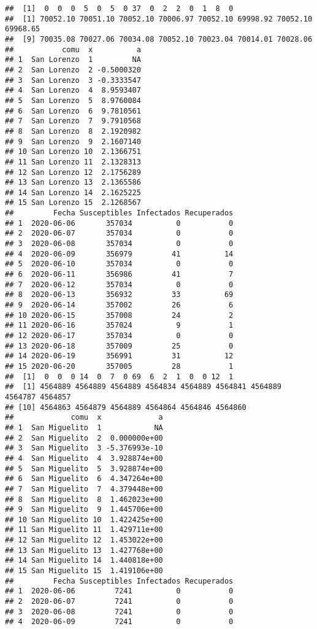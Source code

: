 \documentclass[
]{article}
\begin{document}
\begin{verbatim}
##  [1]  0  0  0  5  0  5  0 37  0  2  2  0  1  8  0
##  [1] 70052.10 70051.10 70052.10 70006.97 70052.10 69998.92 70052.10 69968.65
##  [9] 70035.08 70027.06 70034.08 70052.10 70023.04 70014.01 70028.06
##           comu  x          a
## 1  San Lorenzo  1         NA
## 2  San Lorenzo  2 -0.5000320
## 3  San Lorenzo  3 -0.3333547
## 4  San Lorenzo  4  8.9593407
## 5  San Lorenzo  5  8.9760084
## 6  San Lorenzo  6  9.7810561
## 7  San Lorenzo  7  9.7910568
## 8  San Lorenzo  8  2.1920982
## 9  San Lorenzo  9  2.1607140
## 10 San Lorenzo 10  2.1366751
## 11 San Lorenzo 11  2.1328313
## 12 San Lorenzo 12  2.1756289
## 13 San Lorenzo 13  2.1365586
## 14 San Lorenzo 14  2.1625225
## 15 San Lorenzo 15  2.1268567
##         Fecha Susceptibles Infectados Recuperados
## 1  2020-06-06       357034          0           0
## 2  2020-06-07       357034          0           0
## 3  2020-06-08       357034          0           0
## 4  2020-06-09       356979         41          14
## 5  2020-06-10       357034          0           0
## 6  2020-06-11       356986         41           7
## 7  2020-06-12       357034          0           0
## 8  2020-06-13       356932         33          69
## 9  2020-06-14       357002         26           6
## 10 2020-06-15       357008         24           2
## 11 2020-06-16       357024          9           1
## 12 2020-06-17       357034          0           0
## 13 2020-06-18       357009         25           0
## 14 2020-06-19       356991         31          12
## 15 2020-06-20       357005         28           1
##  [1]  0  0  0 14  0  7  0 69  6  2  1  0  0 12  1
##  [1] 4564889 4564889 4564889 4564834 4564889 4564841 4564889 4564787 4564857
## [10] 4564863 4564879 4564889 4564864 4564846 4564860
##             comu  x             a
## 1  San Miguelito  1            NA
## 2  San Miguelito  2  0.000000e+00
## 3  San Miguelito  3 -5.376993e-10
## 4  San Miguelito  4  3.928874e+00
## 5  San Miguelito  5  3.928874e+00
## 6  San Miguelito  6  4.347264e+00
## 7  San Miguelito  7  4.379448e+00
## 8  San Miguelito  8  1.462023e+00
## 9  San Miguelito  9  1.445706e+00
## 10 San Miguelito 10  1.422425e+00
## 11 San Miguelito 11  1.429711e+00
## 12 San Miguelito 12  1.453022e+00
## 13 San Miguelito 13  1.427768e+00
## 14 San Miguelito 14  1.440818e+00
## 15 San Miguelito 15  1.419106e+00
##         Fecha Susceptibles Infectados Recuperados
## 1  2020-06-06         7241          0           0
## 2  2020-06-07         7241          0           0
## 3  2020-06-08         7241          0           0
## 4  2020-06-09         7241          0           0

\end{verbatim}
\end{document}
